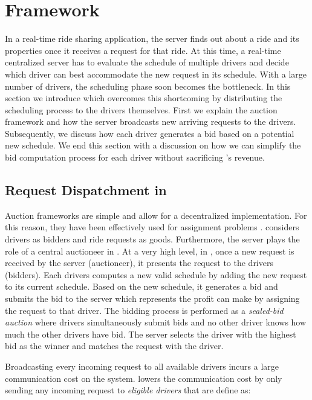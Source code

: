 \section{\fname Framework}

In a real-time ride sharing application, the server finds out about a ride and its properties once it receives a request for that ride. At this time, a real-time centralized server has to evaluate the schedule of multiple drivers and decide which driver can best accommodate the new request in its schedule. With a large number of drivers, the scheduling phase soon becomes the bottleneck. In this section we introduce \fname which overcomes this shortcoming by distributing the scheduling process to the drivers themselves. First we explain the auction framework and how the server broadcasts new arriving requests to the drivers. Subsequently, we discuss how each driver generates a bid based on a potential new schedule. We end this section with a discussion on how we can simplify the bid computation process for each driver without sacrificing \fname 's revenue.

\subsection{Request Dispatchment in \fname}

Auction frameworks are simple and allow for a decentralized implementation. For this reason, they have been effectively used for assignment problems . \fname considers drivers as bidders and ride requests as goods. Furthermore, the server plays the role of a central auctioneer in \fname. At a very high level, in \fname, once a new request is received by the server (auctioneer), it presents the request to the drivers (bidders). Each drivers computes a new valid schedule by adding the new request to its current schedule. Based on the new schedule, it generates a bid and submits the bid to the server which represents the profit \fname can make by assigning the request to that driver. The bidding process is performed as a \textit{sealed-bid auction} where drivers simultaneously submit bids and no other driver knows how much the other drivers have bid. The server selects the driver with the highest bid as the winner and matches the request with the driver.

Broadcasting every incoming request to all available drivers incurs a large communication cost on the system. \fname lowers the communication cost by only sending any incoming request to \textit{eligible drivers} that are define as:


